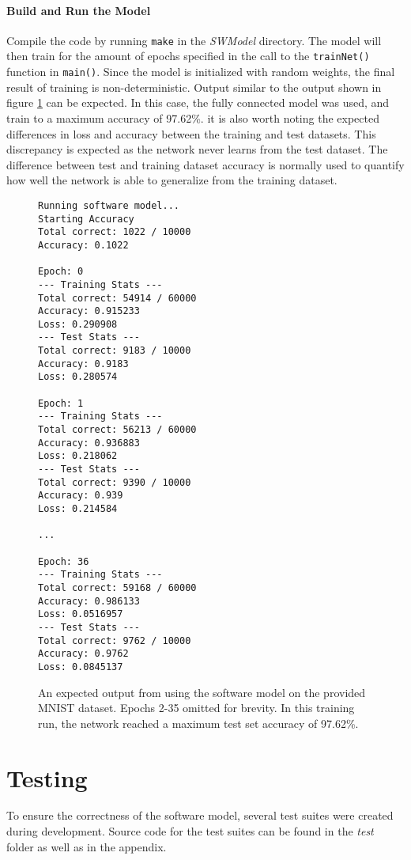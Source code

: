 \paragraph{Build and Run the Model}
Compile the code by running \texttt{make} in the \textit{SWModel} directory. The model will then train for the amount of epochs specified in the call to the \texttt{trainNet()} function in \texttt{main()}. Since the model is initialized with random weights, the final result of training is non-deterministic. Output similar to the output shown in figure \ref{sw-model-output} can be expected. In this case, the fully connected model was used, and train to a maximum accuracy of 97.62\%. it is also worth noting the expected differences in loss and accuracy between the training and test datasets. This discrepancy is expected as the network never learns from the test dataset.
The difference between test and training dataset accuracy is normally used to quantify how well the network is able to generalize from the training dataset.
\begin{figure}
\begin{lstlisting}
Running software model...
Starting Accuracy
Total correct: 1022 / 10000
Accuracy: 0.1022

Epoch: 0
--- Training Stats ---
Total correct: 54914 / 60000
Accuracy: 0.915233
Loss: 0.290908
--- Test Stats ---
Total correct: 9183 / 10000
Accuracy: 0.9183
Loss: 0.280574

Epoch: 1
--- Training Stats ---
Total correct: 56213 / 60000
Accuracy: 0.936883
Loss: 0.218062
--- Test Stats ---
Total correct: 9390 / 10000
Accuracy: 0.939
Loss: 0.214584

...

Epoch: 36
--- Training Stats ---
Total correct: 59168 / 60000
Accuracy: 0.986133
Loss: 0.0516957
--- Test Stats ---
Total correct: 9762 / 10000
Accuracy: 0.9762
Loss: 0.0845137
\end{lstlisting}
\caption{An expected output from using the software model on the provided MNIST dataset. Epochs 2-35 omitted for brevity. In this training run, the network reached a maximum test set accuracy of 97.62\%.}
\label{sw-model-output}
\end{figure}

\section{Testing}
To ensure the correctness of the software model, several test suites were created during development. Source code for the test suites can be found in the \textit{test} folder as well as in the appendix.
